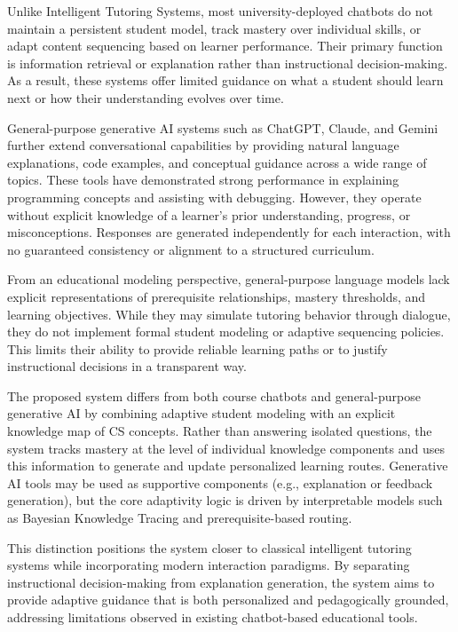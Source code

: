 \documentclass{article}
\begin{document}
Unlike Intelligent Tutoring Systems, most university-deployed chatbots do not
maintain a persistent student model, track mastery over individual skills, or
adapt content sequencing based on learner performance. Their primary function is
information retrieval or explanation rather than instructional decision-making.
As a result, these systems offer limited guidance on what a student should learn
next or how their understanding evolves over time.

General-purpose generative AI systems such as ChatGPT, Claude, and Gemini further
extend conversational capabilities by providing natural language explanations,
code examples, and conceptual guidance across a wide range of topics. These tools
have demonstrated strong performance in explaining programming concepts and
assisting with debugging. However, they operate without explicit knowledge of a
learner’s prior understanding, progress, or misconceptions. Responses are
generated independently for each interaction, with no guaranteed consistency or
alignment to a structured curriculum.

From an educational modeling perspective, general-purpose language models lack
explicit representations of prerequisite relationships, mastery thresholds, and
learning objectives. While they may simulate tutoring behavior through dialogue,
they do not implement formal student modeling or adaptive sequencing policies.
This limits their ability to provide reliable learning paths or to justify
instructional decisions in a transparent way.

The proposed system differs from both course chatbots and general-purpose
generative AI by combining adaptive student modeling with an explicit knowledge
map of CS concepts. Rather than answering isolated questions, the system tracks
mastery at the level of individual knowledge components and uses this information
to generate and update personalized learning routes. Generative AI tools may be
used as supportive components (e.g., explanation or feedback generation), but the
core adaptivity logic is driven by interpretable models such as Bayesian Knowledge
Tracing and prerequisite-based routing.

This distinction positions the system closer to classical intelligent tutoring
systems while incorporating modern interaction paradigms. By separating
instructional decision-making from explanation generation, the system aims to
provide adaptive guidance that is both personalized and pedagogically grounded,
addressing limitations observed in existing chatbot-based educational tools.
\end{document}
